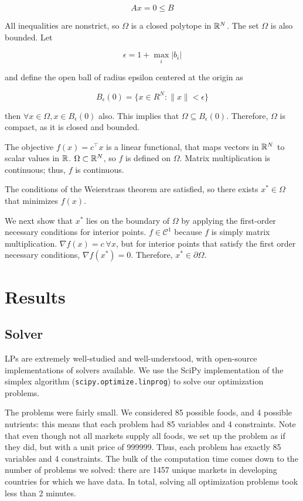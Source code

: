 \begin{equation*}
    Ax = 0 \leq B
\end{equation*}

All inequalities are nonstrict, so $\Omega$ is a closed polytope in $\mathbb{R}^N$. The
set $\Omega$ is also bounded. Let

\begin{equation*}
    \epsilon = 1 + \max_i |b_i|
\end{equation*}

and define the open ball of radius epsilon centered at the origin as

\begin{equation*}
    B_\epsilon (0) = \{x \in R^N: \|x\| < \epsilon\}
\end{equation*}

then $\forall x \in \Omega, x \in B_\epsilon (0)$ also. This implies that $
\Omega \subseteq B_\epsilon (0) $. Therefore, $\Omega$ is compact, as it is
closed and bounded.

The objective $f(x) = c^\top x$ is a linear functional, that maps
vectors in $\mathbb{R}^N$ to scalar values in $\mathbb{R}$. $\Omega \subset \mathbb{R}^N$, so $f$ is
defined on $\Omega$. Matrix multiplication is continuous; thus, $f$ is continuous.

The conditions of the Weierstrass theorem are satisfied, so there exists $x^*
\in \Omega$ that minimizes $f(x)$.

We next show that $x^*$ lies on the boundary of $\Omega$ by applying the
first-order necessary conditions for interior points. $f \in \mathcal{C}^1$
because $f$ is simply matrix multiplication. $\nabla f(x) = c\ \forall x$, but
for interior points that satisfy the first order necessary conditions, $\nabla
f(x^*) = 0$. Therefore, $x^* \in \partial \Omega$.

\section{Results}
\subsection{Solver}
LPs are extremely well-studied and well-understood, with open-source
implementations of solvers available. We use the SciPy implementation of the
simplex algorithm (\texttt{scipy.optimize.linprog}) to solve our optimization
problems.\cite{SciPy}

The problems were fairly small. We considered 85 possible foods, and 4 possible nutrients: this means that each problem had 85 variables and 4 constraints. Note that even though not all markets supply all foods, we set up the problem as if they did, but with a unit price of 999999. Thus, each problem has exactly 85 variables and 4 constraints. The bulk of the computation time comes down to the number of problems we solved: there are 1457 unique markets in developing countries for which we have data. In total, solving all optimization problems took less than 2 minutes.

